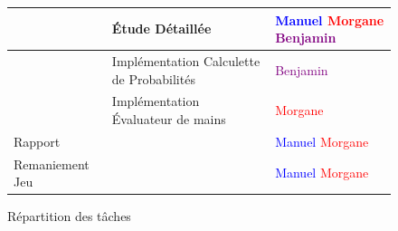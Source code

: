 \documentclass{report}
\begin{document}
\begin{figure}[h]
\begin{tabular}{|l|l|l|}
  				 \hline
  				 & Étude Détaillée & \textcolor{blue}{Manuel}  \textcolor{red}{Morgane} \textcolor{purple}{Benjamin}\\
  				 \hline
  				 & Implémentation Calculette de Probabilités & \textcolor{purple}{Benjamin}\\
  				 \hline
  				 & Implémentation Évaluateur de mains & \textcolor{red}{Morgane} \\
  				 \hline
  				 Rapport & & \textcolor{blue}{Manuel}  \textcolor{red}{Morgane} \\
  				 \hline
  				 Remaniement Jeu & & \textcolor{blue}{Manuel}  \textcolor{red}{Morgane} \\
   				\hline
			\end{tabular}	
			\caption{Répartition des tâches}
		\end{figure}
		\medskip
\end{document}
